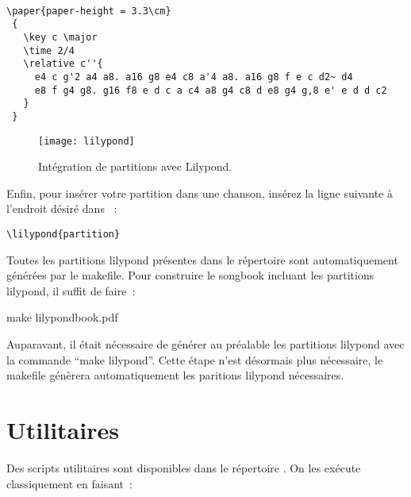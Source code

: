 \documentclass[online]{patacrep}
\begin{document}
\begin{verbatim}

\paper{paper-height = 3.3\cm}
 {
   \key c \major
   \time 2/4
   \relative c''{
     e4 c g'2 a4 a8. a16 g8 e4 c8 a'4 a8. a16 g8 f e c d2~ d4
     e8 f g4 g8. g16 f8 e d c a c4 a8 g4 c8 d e8 g4 g,8 e' e d d c2
   }
 }
\end{verbatim}

\begin{figure}
  \centering
  \texttt{[image: lilypond]}
  \caption{Intégration de partitions avec Lilypond.}
  \label{fig:lilypond}
\end{figure}

Enfin, pour insérer votre partition dans une chanson, insérez la ligne
suivante à l'endroit désiré dans ~:

\begin{verbatim}
\lilypond{partition}
\end{verbatim}

Toutes les partitions lilypond présentes dans le répertoire
 sont automatiquement générées par le
makefile. Pour construire le songbook incluant les partitions
lilypond, il suffit de faire~:

\begin{unixcom}
  make lilypondbook.pdf 
\end{unixcom}

\begin{nota}
  Auparavant, il était nécessaire de générer au préalable les
  partitions lilypond avec la commande ``make lilypond''. Cette étape
  n'est désormais plus nécessaire, le makefile génèrera
  automatiquement les paritions lilypond nécessaires.
\end{nota}

\section{Utilitaires}
\label{sec:utilitaires}

Des scripts utilitaires sont disponibles dans le répertoire
. On les exécute classiquement en faisant~:

\end{document}
